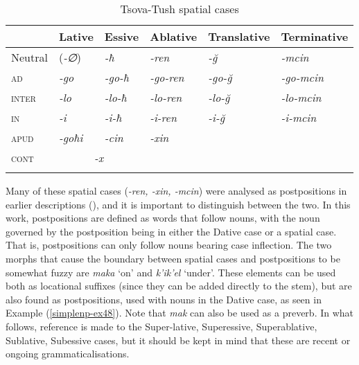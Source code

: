 \begin{table}
	\begin{tabular}{llllll}
    \lsptoprule
		& Lative &  {Essive} & {Ablative} & {Translative} &  {Terminative} \\
		\midrule
		Neutral & (\textit{-∅}) &  \textit{-ħ} &  \textit{-ren} & \textit{-\u{g}} & \textit{-mcin} \\
		
		\textsc{{ad}} &  \textit{-go}  & \textit{-go-ħ} &  \textit{-go-ren} & \textit{-go-\u{g}} &  \textit{-go-mcin} \\
		
		\textsc{{inter}} &  \textit{-lo} &  \textit{-lo-ħ} &  \textit{-lo-ren} & \textit{-lo-\u{g}} & \textit{-lo-mcin} \\
		
		\textsc{{in}} &  \textit{-i} &  \textit{-i-ħ}  & \textit{-i-ren} & \textit{-i-\u{g}} & \textit{-i-mcin} \\
		
		\midrule
		
		\textsc{{apud}}  &  \textit{-goħi} &  \textit{-cin}  & \textit{-xin} & & \\
		
		\textsc{{cont}} & \multicolumn{2}{c}{\textit{-x}} & & & \\
		\lspbottomrule
	\end{tabular}
	\caption{Tsova-Tush spatial cases}
	\label{table-spacase}
\end{table}


Many of these spatial cases (\textit{-ren, -xin, -mcin}) were analysed as postpositions in earlier descriptions (\cite[168--170]{holiskygagua}), and it is important to distinguish between the two. In this work, postpositions are defined as words that follow nouns, with the noun governed by the postposition being in either the Dative case or a spatial case. That is, postpositions can only follow nouns bearing case inflection. The two morphs that cause the boundary between spatial cases and postpositions to be somewhat fuzzy are \textit{maka} `on' and \textit{k'ik'el} `under'. These elements can be used both as locational suffixes (since they can be added directly to the stem), but are also found as postpositions, used with nouns in the Dative case, as seen in Example (\ref{simplenp-ex48}). Note that \textit{mak} can also be used as a preverb. In what follows, reference is made to the Super-lative, Superessive, Superablative, Sublative, Subessive cases, but it should be kept in mind that these are recent or ongoing grammaticalisations.

